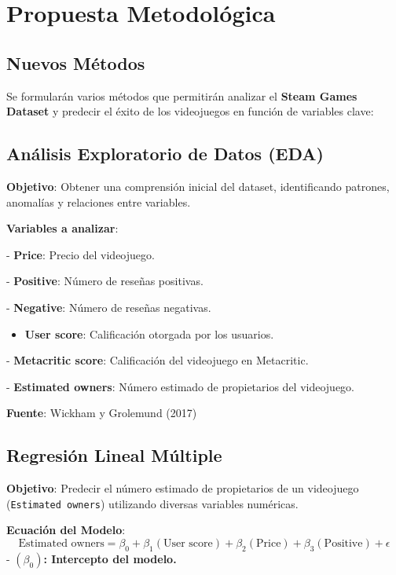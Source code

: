 \documentclass[
  letterpaper,
  DIV=11,
  numbers=noendperiod]{scrreprt}
\providecommand{\tightlist}{%
  \setlength{\itemsep}{0pt}\setlength{\parskip}{0pt}}\usepackage{longtable,booktabs,array}
\begin{document}
\section{Propuesta Metodológica}\label{propuesta-metodoluxf3gica}

\subsection{Nuevos Métodos}\label{nuevos-muxe9todos}

Se formularán varios métodos que permitirán analizar el \textbf{Steam
Games Dataset} y predecir el éxito de los videojuegos en función de
variables clave:

\subsection{Análisis Exploratorio de Datos
(EDA)}\label{anuxe1lisis-exploratorio-de-datos-eda}

\textbf{Objetivo}: Obtener una comprensión inicial del dataset,
identificando patrones, anomalías y relaciones entre variables.

\textbf{Variables a analizar}:

- \textbf{Price}: Precio del videojuego.

- \textbf{Positive}: Número de reseñas positivas.

- \textbf{Negative}: Número de reseñas negativas.

\begin{itemize}
\tightlist
\item
  \textbf{User score}: Calificación otorgada por los usuarios.
\end{itemize}

- \textbf{Metacritic score}: Calificación del videojuego en Metacritic.

- \textbf{Estimated owners}: Número estimado de propietarios del
videojuego.

\textbf{Fuente}: Wickham y Grolemund (2017)

\subsection{Regresión Lineal
Múltiple}\label{regresiuxf3n-lineal-muxfaltiple}

\textbf{Objetivo}: Predecir el número estimado de propietarios de un
videojuego (\texttt{Estimated\ owners}) utilizando diversas variables
numéricas.

\textbf{Ecuación del Modelo}: \[
\text{Estimated owners} = \beta_0 + \beta_1 (\text{User score}) + \beta_2 (\text{Price}) + \beta_3 (\text{Positive}) + \epsilon
\] - \((\beta_0)\)\textbf{: Intercepto del modelo.}
\end{document}
